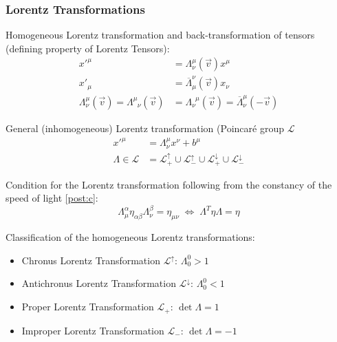 		\subsubsection{Lorentz Transformations}
			\noindent
			Homogeneous Lorentz transformation and back-transformation of tensors (defining property of Lorentz Tensors):%
			\begin{equation}
				\begin{aligned}
					x'^\mu &= \Lambda^{\mu}_{\nu}(\vec{v}) x^\mu \\
					x'_\mu &= \overline{\Lambda}_\mu^{\nu}(\vec{v}) x_\nu \\
					\Lambda^{\mu}_{\nu}(\vec{v}) = \Lambda^{\mu}_{\phantom{\mu}\nu}(\vec{v}) &= \Lambda^{\phantom{\nu}\mu}_{\nu}(\vec{v}) = \overline{\Lambda}^{\mu}_{\nu}(-\vec{v})
				\end{aligned}
			\end{equation}

			\noindent
			General (inhomogeneous) Lorentz transformation (Poincaré group $\mathcal{L}$%
			\begin{equation}
				\begin{aligned}
					x'^\mu &= \Lambda^\mu_{\nu} x^\nu + b^\mu \\
					\Lambda \in \mathcal{L} &= \mathcal{L}^\uparrow_+ \cup \mathcal{L}^\uparrow_- \cup \mathcal{L}^\downarrow_+ \cup \mathcal{L}^\downarrow_-
				\end{aligned}
			\end{equation}

			\noindent
			Condition for the Lorentz transformation following from the constancy of the speed of light \ref{post:c}:%
			\begin{equation}
				\Lambda^{\alpha}_{\mu} \eta_{\alpha\beta} \Lambda^{\beta}_{\nu} = \eta_{\mu\nu}
				 \;\Leftrightarrow\; \Lambda^T \eta \Lambda = \eta
			\end{equation}

			\noindent
			Classification of the homogeneous Lorentz transformations:%
			\begin{itemize}
				\item Chronus Lorentz Transformation $\mathcal{L}^\uparrow$: $\Lambda^0_0 > 1$
				\item Antichronus Lorentz Transformation $\mathcal{L}^\downarrow$: $\Lambda^0_0 < 1$
				\item Proper Lorentz Transformation $\mathcal{L}_+$: $\det\Lambda = 1$
				\item Improper Lorentz Transformation $\mathcal{L}_-$: $\det\Lambda = -1$
			\end{itemize}

